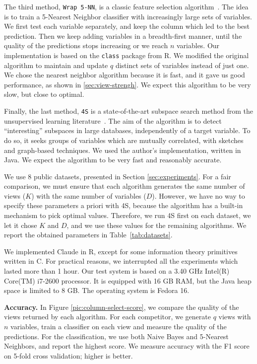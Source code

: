 The third method, \texttt{Wrap 5-NN}, is a classic feature selection
algorithm~\cite{guyon2003introduction}. The idea is to train a 5-Nearest
Neighbor classifier with increasingly large sets of variables. We first test
each variable separately, and keep the column which led to the best prediction.
Then we keep adding variables in a breadth-first manner, until the
quality of the predictions stops increasing or we reach $n$ variables. Our
implementation is based on the \texttt{class} package from R.  We modified the
original algorithm to maintain and update $q$ distinct sets of variables
instead of just one. We chose the nearest neighbor algorithm because it is
fast, and it gave us good performance, as shown in \ref{sec:view-strengh}. We
expect this algorithm to be very slow, but close to optimal.

Finally, the last method, \texttt{4S} is a state-of-the-art subspace search
method from the unsupervised learning literature~\cite{nguyen20134s}. The aim
of the algorithm is to detect ``interesting'' subspaces in large databases,
independently of a target variable. To do so, it seeks groups of variables
which are mutually correlated, with sketches and graph-based techniques.  We
used the author's implementation, written in Java. We expect the algorithm to
be very fast and reasonably accurate.

We use 8 public datasets, presented in Section \ref{sec:experiments}. For a
fair comparison, we must ensure that each algorithm generates the same number
of views ($K$) with the same number of variables ($D$).  However, we have no
way to specify these parameters a priori with 4S, because the algorithm has a
built-in mechanism to pick optimal values. Therefore, we run 4S first on each
dataset, we let it chose $K$ and $D$, and we use these values for the remaining
algorithms.  We report the obtained parameters in Table~\ref{tab:datasets}.

We implemented Claude in R, except for some information theory primitives
written in C. For practical reasons, we interrupted all the experiments which
lasted more than 1 hour. Our test system is based on a 3.40 GHz Intel(R)
Core(TM) i7-2600 processor. It is equipped with 16 GB RAM, but the Java heap
space is limited to 8 GB. The operating system is Fedora 16. 


\textbf{Accuracy.} In Figure \ref{pic:column-select-score}, we compare the
quality of the views returned by each algorithm. For each competitor, we
generate $q$ views with $n$ variables, train a classifier on each view and
measure the quality of the predictions. For the classification, we use both
Naive Bayes and 5-Nearest Neighbors, and report the highest score.  We measure
accuracy with the F1 score on 5-fold cross validation; higher is better.

